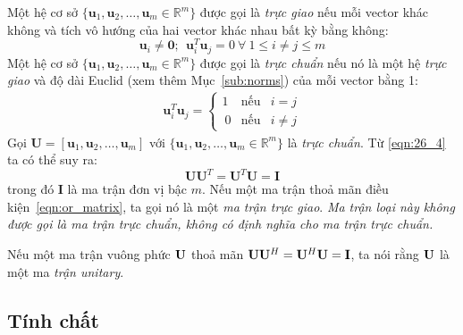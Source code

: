 Một hệ cơ sở $\{\mathbf{u}_1, \mathbf{u}_2,\dots, \mathbf{u}_m \in
\mathbb{R}^m\}$ được gọi là \textit{trực giao} nếu mỗi vector khác không và tích
vô hướng của hai vector khác nhau bất kỳ bằng không:
\begin{equation}
\mathbf{u}_i \neq \mathbf{0}; ~~ \mathbf{u}_i^T \mathbf{u}_j = 0
~ \forall ~1 \leq i \neq j \leq m
\end{equation}
Một hệ cơ sở $\{\mathbf{u}_1, \mathbf{u}_2,\dots, \mathbf{u}_m \in
\mathbb{R}^m\}$ được gọi là \textit{trực chuẩn} nếu nó là một hệ \textit{trực
giao} và độ dài Euclid (xem thêm Mục~\ref{sub:norms}) của mỗi vector bằng 1:
\begin{eqnarray}
\label{eqn:26_4}
\mathbf{u}_i^T \mathbf{u}_j = \left\{
\begin{matrix}
1 & \text{nếu} &i = j \\\
0 & \text{nếu} &i \neq j
\end{matrix}
\right.
\end{eqnarray}
Gọi $\mathbf{U} = [\mathbf{u}_1, \mathbf{u}_2,\dots, \mathbf{u}_m]$ với
$\{\mathbf{u}_1, \mathbf{u}_2,\dots, \mathbf{u}_m \in \mathbb{R}^m\}$ là
\textit{trực chuẩn}. Từ \eqref{eqn:26_4} ta có thể suy ra:
\begin{equation}
\label{eqn:or_matrix}
\mathbf{UU}^T = \mathbf{U}^T\mathbf{U} = \mathbf{I}
\end{equation}
trong đó $\mathbf{I}$ là ma trận đơn vị bậc $m$. Nếu một ma trận thoả mãn điều
kiện~\eqref{eqn:or_matrix}, ta gọi nó là một \textit{ma trận trực giao}.
\textit{Ma trận loại này không được gọi là ma trận trực chuẩn, không có định
nghĩa cho ma trận trực chuẩn.}


Nếu một ma trận vuông phức $\mathbf{U}$ thoả mãn $\mathbf{U}\mathbf{U}^H = \mathbf{U}^H\mathbf{U} = \mathbf{I}$, ta nói
rằng $\mathbf{U}$ là một ma \textit{trận unitary}.

\subsection{Tính chất} %

